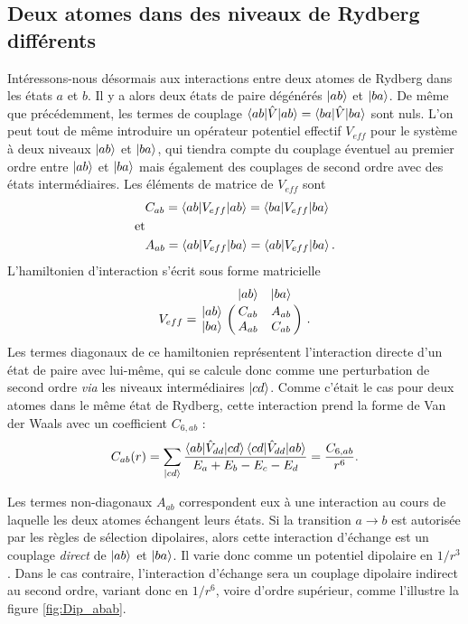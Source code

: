 \subsection{Deux atomes dans des niveaux de Rydberg différents}
\label{subsec:interaction_diff_levels}
Intéressons-nous désormais aux interactions entre deux atomes de Rydberg dans les états $a$ et $b$.
Il y a alors deux états de paire dégénérés $\ket{ab}$ et $\ket{ba}$.
De même que précédemment, les termes de couplage $\braket{ab|\hat{V}|ab}=\braket{ba|\hat{V}|ba}$ sont nuls.
L'on peut tout de même introduire un opérateur potentiel effectif $V_{eff}$ pour le système à deux niveaux $\ket{ab}$ et $\ket{ba}$, qui tiendra compte du couplage éventuel au premier ordre entre $\ket{ab}$ et $\ket{ba}$ mais également des couplages de second ordre avec des états intermédiaires.
Les éléments de matrice de $V_{eff}$ sont
%
\begin{equation}\label{eq:Cab_Aab}
\begin{aligned}
&C_{ab}=\braket{ab|V_{eff}|ab}=\braket{ba|V_{eff}|ba} \\
\text{et} &\\
&A_{ab}=\braket{ab|V_{eff}|ba}=\braket{ab|V_{eff}|ba}.
\end{aligned}
\end{equation}
%
L'hamiltonien d'interaction s'écrit sous forme matricielle
\begin{equation}\label{eq:MatrixCab_Aab}
V_{eff} = \bordermatrix{~ 	&\ket{ab} 	& \ket{ba} \cr
	\ket{ab}		&C_{ab} 		&A_{ab}	\cr 
	\ket{ba} 		&A_{ab} 		&C_{ab} \cr} \ .
\end{equation}
%
Les termes diagonaux de ce hamiltonien représentent l'interaction directe d'un état de paire avec lui-même, qui se calcule donc comme une perturbation de second ordre \textit{via} les niveaux intermédiaires $\ket{cd}$.
Comme c'était le cas pour deux atomes dans le même état de Rydberg, cette interaction prend la forme de Van der Waals avec un coefficient $C_{6,ab}$ :
\begin{equation}\label{eq:VdW_abab}
C_{ab}(r)=\sum_{\ket{cd}}{\frac{\braket{ab|\hat{V}_{dd}|cd}\braket{cd|\hat{V}_{dd}|ab}}{E_a + E_b - E_c - E_d}}  = \frac{C_{6,ab}}{r^6}.
\end{equation}

Les termes non-diagonaux $A_{ab}$ correspondent eux à une interaction au cours de laquelle les deux atomes échangent leurs états.
Si la transition $a\rightarrow b$ est autorisée par les règles de sélection dipolaires, alors cette interaction d'échange est un couplage \textit{direct} de $\ket{ab}$ et $\ket{ba}$.
Il varie donc comme un potentiel dipolaire en $1/r^3$.
Dans le cas contraire, l'interaction d'échange sera un couplage dipolaire indirect au second ordre, variant donc en $1/r^6$, voire d'ordre supérieur, comme l'illustre la figure \eqref{fig:Dip_abab}.

